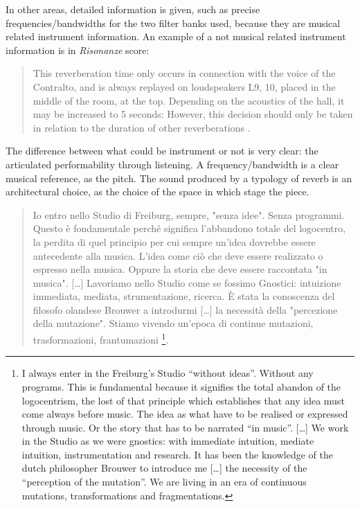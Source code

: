 \documentclass[twoside,a4paper]{article}
\begin{document}
In other areas, detailed information is given, such as precise frequencies/bandwidths for the two filter banks used, because they are musical related instrument information. An example of a not musical related instrument information is in \emph{Risonanze} score:

\begin{quote}
This reverberation time only occurs in connection with the voice of the Contralto, and is always replayed on loudspeakers L9, 10, placed in the middle of the room, at the top. Depending on the acoustics of the hall, it may be increased to 5 seconds: However, this decision should only be taken in relation to the duration of other reverberations \cite{nlre87}.
\end{quote}

The difference between what could be instrument or not is very clear: the articulated performability through listening. A frequency/bandwidth is a clear musical reference, as the pitch. The sound produced by a typology of reverb is an architectural choice, as the choice of the space in which stage the piece.

\begin{quote}
Io entro nello Studio di Freiburg, sempre, "senza idee". Senza programmi. Questo è fondamentale perché significa l'abbandono totale del logocentro, la perdita di quel principio per cui sempre un'idea dovrebbe essere antecedente alla musica. L'idea come ciò che deve essere realizzato o espresso nella musica. Oppure la storia che deve essere raccontata "in musica". [\ldots] %
Lavoriamo nello Studio come se fossimo Gnostici: intuizione immediata, mediata, strumentazione, ricerca. È stata la conoscenza del filosofo olandese Brouwer a introdurmi [\ldots] la necessità della "percezione della mutazione". Stiamo vivendo un'epoca di continue mutazioni, trasformazioni, frantumazioni \cite{nono85}\footnote{I always enter in the Freiburg’s Studio “without ideas”. Without any programs. This is fundamental because it signifies the total abandon of the logocentrism, the lost of that principle which establishes that any idea must come always before music. The idea as what have to be realised or expressed through music. Or the story that has to be narrated “in music”. [\dots] We work in the Studio as we were gnostics: with immediate intuition, mediate intuition, instrumentation and research. It has been the knowledge of the dutch philosopher Brouwer to introduce me [\dots] the necessity of the “perception of the mutation”. We are living in an era of continuous mutations, transformations and fragmentations.}.
\end{quote}
\end{document}
